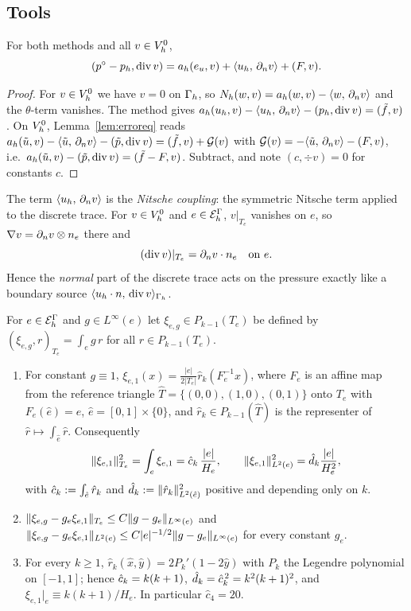 \subsection{Tools}\label{pd:sec:tools}

\begin{lemma}\label{pd:lem:v0}
For both methods and all $v\in V_h^0$,
\[
(p^\circ-p_h,\operatorname{div} v)=a_h(e_u,v)+\langle u_h,\, \partial_n v\rangle+(F,v).
\]
\end{lemma}

\begin{proof}
For $v\in V_h^0$ we have $v=0$ on $\Gamma_h$, so $N_h(w,v)=a_h(w,v)-\langle w,\, \partial_n v\rangle$ and the $\theta$-term vanishes. The method gives $a_h(u_h,v)-\langle u_h,\, \partial_n v\rangle-(p_h,\operatorname{div} v)=(\tilde f,v)$. On $V_h^0$, Lemma~\ref{lem:erroreq} reads $a_h(\tilde u,v)-\langle \tilde u,\, \partial_n v\rangle-(\tilde p,\operatorname{div} v)=(\tilde f,v)+\mathcal G(v)$ with $\mathcal G(v)=-\langle \tilde u,\, \partial_n v\rangle-(F,v)$, i.e.\ $a_h(\tilde u,v)-(\tilde p,\operatorname{div} v)=(\tilde f-F,v)$. Subtract, and note $(c,\div v)=0$ for constants $c$.
\end{proof}

The term $\langle u_h,\, \partial_n v\rangle$ is the \emph{Nitsche coupling}: the symmetric Nitsche term applied to the discrete trace. For $v\in V_h^0$ and $e\in\mathcal E_h^\Gamma$, $v|_{T_e}$ vanishes on $e$, so $\nabla v=\partial_n v\otimes n_e$ there and
\begin{equation}\label{pd:eq:divtrace}
(\operatorname{div} v)|_{T_e}=\partial_n v\cdot n_e\quad\text{on }e .
\end{equation}
Hence the \emph{normal} part of the discrete trace acts on the pressure exactly like a boundary source $\langle u_h\cdot n,\, \operatorname{div} v\rangle_{\Gamma_h}$.

\begin{lemma}\label{pd:lem:rep}
For $e\in\mathcal E_h^\Gamma$ and $g\in L^\infty(e)$ let $\xi_{e,g}\in P_{k-1}(T_e)$ be defined by $(\xi_{e,g},r)_{T_e}=\int_eg\,r$ for all $r\in P_{k-1}(T_e)$.
\begin{enumerate}[label=(\alph*)]
\item For constant $g\equiv1$, $\xi_{e,1}(x)=\frac{|e|}{2|T_e|}\hat r_k(F_e^{-1}x)$, where $F_e$ is an affine map from the reference triangle $\hat T=\{(0,0),(1,0),(0,1)\}$ onto $T_e$ with $F_e(\hat e)=e$, $\hat e=[0,1]\times\{0\}$, and $\hat r_k\in P_{k-1}(\hat T)$ is the representer of $\hat r\mapsto\int_{\hat e}\hat r$. Consequently
\[
\lVert \xi_{e,1}\rVert^2_{T_e}=\int_e\xi_{e,1}=\hat c_k\,\frac{|e|}{H_e},\qquad \lVert \xi_{e,1}\rVert^2_{L^2(e)}=\hat d_k\frac{|e|}{H_e^2},
\]
with $\hat c_k:=\int_{\hat e}\hat r_k$ and $\hat d_k:=\lVert \hat r_k\rVert^2_{L^2(\hat e)}$ positive and depending only on $k$.
\item $\lVert \xi_{e,g}-g_e\xi_{e,1}\rVert_{T_e}\le C\lVert g-g_e\rVert_{L^\infty(e)}$ and $\lVert \xi_{e,g}-g_e\xi_{e,1}\rVert_{L^2(e)}\le C|e|^{-1/2}\lVert g-g_e\rVert_{L^\infty(e)}$ for every constant $g_e$.
\item For every $k\ge1$, $\hat r_k(\hat x,\hat y)=2P_k'(1-2\hat y)$ with $P_k$ the Legendre polynomial on $[-1,1]$; hence $\hat c_k=k(k+1)$, $\hat d_k=\hat c_k^{\,2}=k^2(k+1)^2$, and $\xi_{e,1}|_e\equiv k(k+1)/H_e$. In particular $\hat c_4=20$.
\end{enumerate}
\end{lemma}

